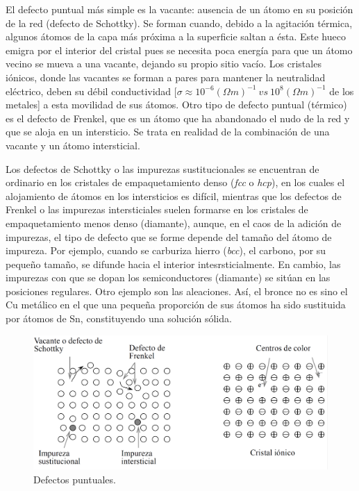 El defecto puntual más simple es la vacante: ausencia de un átomo en su posición de la red (defecto de Schottky). Se forman cuando, debido a la agitación térmica, algunos átomos de la capa más próxima a la superficie saltan a ésta. Este hueco emigra por el interior del cristal pues se necesita poca energía para que un átomo vecino se mueva a una vacante, dejando su propio sitio vacío. Los cristales iónicos, donde las vacantes se forman a pares para mantener la neutralidad eléctrico, deben su débil conductividad $[ \sigma \approx 10^{-6} (\Omega m)^{-1} \ vs \ 10^8 (\Omega m)^{-1}$ de los metales] a esta movilidad de sus  átomos. Otro tipo de defecto puntual (térmico) es el defecto de Frenkel, que es un átomo que ha abandonado el nudo de la red y que se aloja en un intersticio. Se trata en realidad de la combinación de una vacante y un átomo intersticial. %

Los defectos de Schottky o las impurezas sustitucionales se encuentran de ordinario en los cristales de empaquetamiento denso ({\it fcc} o {\it hcp}), en los cuales el alojamiento de átomos en los intersticios es difícil, mientras que los defectos de Frenkel o las impurezas intersticiales suelen formarse en los cristales de empaquetamiento menos denso (diamante), aunque, en el caos de la adición de impurezas, el tipo de defecto que se forme depende del tamaño del átomo de impureza. Por ejemplo, cuando se carburiza hierro ({\it bcc}), el carbono, por su pequeño tamaño, se difunde hacia el interior intesrsticialmente. En cambio, las impurezas con que se dopan los semiconductores (diamante) se sitúan en las posiciones regulares. Otro ejemplo son las aleaciones. Así, el bronce no es sino el Cu metálico en el que una pequeña proporción de sus átomos ha sido sustituida por átomos de Sn, constituyendo una solución sólida. 

\begin{figure}[h!] \centering
    \includegraphics[scale=0.42]{Cuerpo/Ch_01/defectos.png}
    \caption{Defectos puntuales.}
\end{figure}


